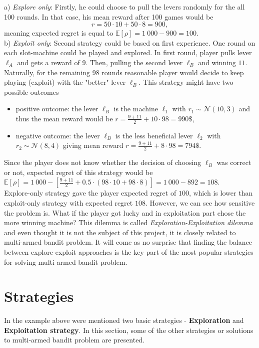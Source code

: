 \documentclass[11pt,american,czech]{article}
\begin{document}
	a) \textit{Explore only}: Firstly, he could choose to pull the levers randomly for the all 100 rounds. In that case, his mean reward after 100 games would be $$r = 50\cdot 10 + 50\cdot 8 = 900,$$ meaning expected regret  is equal to $\mathbb{E}[\rho] = 1~000-900=100$.\\
	
	b) \textit{Exploit only}: Second strategy could be based on first experience. One round on each slot-machine could be played and explored. In first round, player pulls lever $\ell_A$ and gets a reward of $9$. Then, pulling the second lever $\ell_B$ and winning $11 $. Naturally, for the remaining 98 rounds reasonable player would decide to keep playing (exploit) with the "better" lever $\ell_B$. This strategy might have two possible outcomes
	\begin{itemize}
		\item positive outcome: the lever $\ell_B$ is the machine $\ell_1$ with $r_1\sim\mathcal{N}(10,3)$ and thus the mean reward would be $r=\frac{9+11}{2}+10\cdot98=990\$$,
		\item negative outcome: the lever $\ell_B$ is the less beneficial lever $\ell_2$ with $r_2\sim\mathcal{N}(8,4)$ giving mean reward $r = \frac{9+11}{2}+8\cdot98=794\$$.
	\end{itemize}
	Since the player does not know whether the decision of choosing $\ell_B$ was correct or not, expected regret of this strategy would be $\mathbb{E}[\rho]=1~000 - [\frac{9+11}{2} + 0.5\cdot(98\cdot10 + 98\cdot8)] =1~000 - 892=108$.\\
	
	Explore-only strategy gave the player expected regret of $100$, which is lower than exploit-only strategy with expected regret $108$. However, we can see how sensitive the problem is. What if the player got lucky and in exploitation part chose the more winning machine? This dilemma is called \textit{Exploration-Exploitation dilemma} and even thought it is not the subject of this project, it is closely related to multi-armed bandit problem. It will come as no surprise that finding the balance between explore-exploit approaches is the key part of the most popular strategies for solving multi-armed bandit problem.
	\newpage
	\section*{Strategies}
	In the example above were mentioned two basic strategies - \textbf{Exploration} and \textbf{Exploitation strategy}. In this section, some of the other strategies or solutions to multi-armed bandit problem are presented.
\end{document}
